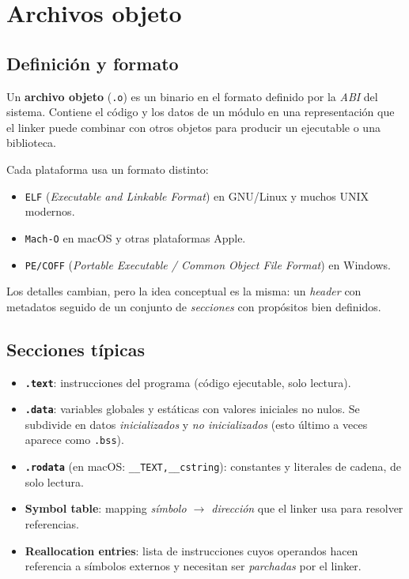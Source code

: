 \documentclass[11pt,a4paper]{article}
\begin{document}
\section{Archivos objeto}

\subsection{Definición y formato}

\begin{definicion}
Un \textbf{archivo objeto} (\texttt{.o}) es un binario en el formato
definido por la \emph{ABI} del sistema. Contiene el código y los
datos de un módulo en una representación que el linker puede combinar
con otros objetos para producir un ejecutable o una biblioteca.
\end{definicion}

Cada plataforma usa un formato distinto:

\begin{itemize}[leftmargin=*]
    \item \texttt{ELF} (\emph{Executable and Linkable Format}) en
        GNU/Linux y muchos UNIX modernos.
    \item \texttt{Mach-O} en macOS y otras plataformas Apple.
    \item \texttt{PE/COFF} (\emph{Portable Executable / Common Object
        File Format}) en Windows.
\end{itemize}

Los detalles cambian, pero la idea conceptual es la misma: un
\emph{header} con metadatos seguido de un conjunto de \emph{secciones}
con propósitos bien definidos.

\subsection{Secciones típicas}

\begin{itemize}[leftmargin=*]
    \item \textbf{\texttt{.text}}: instrucciones del programa (código
        ejecutable, solo lectura).
    \item \textbf{\texttt{.data}}: variables globales y estáticas con
        valores iniciales no nulos. Se subdivide en datos
        \emph{inicializados} y \emph{no inicializados} (esto último a
        veces aparece como \texttt{.bss}).
    \item \textbf{\texttt{.rodata}} (en macOS:
        \texttt{\_\_TEXT,\_\_cstring}): constantes y literales de
        cadena, de solo lectura.
    \item \textbf{Symbol table}: mapping
        \emph{símbolo $\to$ dirección} que el linker usa para resolver
        referencias.
    \item \textbf{Reallocation entries}: lista de instrucciones cuyos
        operandos hacen referencia a símbolos externos y necesitan ser
        \emph{parchadas} por el linker.
\end{itemize}
\end{document}
